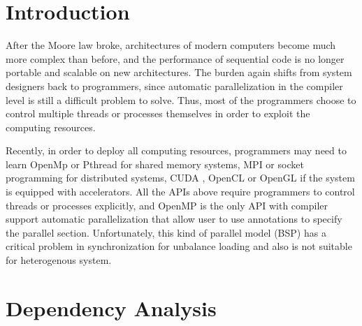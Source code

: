 \documentclass[preprint,11pt]{elsarticle}
\begin{document}
\linenumbers \linenumberdisplaymath

\section{Introduction}
  After the Moore law broke, architectures of modern computers become much more 
  complex than before, and the performance of sequential code is no longer portable and 
  scalable on new architectures. The burden again shifts from system designers back to 
  programmers, since automatic parallelization in the compiler level is still a difficult problem to 
  solve. Thus, most of the programmers choose to control multiple threads or processes 
  themselves in order to exploit the computing resources.  
  
  Recently, in order to deploy all computing resources, programmers may need to learn 
  OpenMp \cite{} or Pthread \cite{} for shared memory systems, MPI \cite{} or socket 
  programming for distributed systems, CUDA \cite{}, OpenCL \cite{} or OpenGL \cite{} if the 
  system is equipped with accelerators. 
  All the APIs above require programmers to control threads or processes explicitly, and
  OpenMP is the only API with compiler support automatic parallelization that allow user to 
  use annotations to specify the parallel section. Unfortunately, this kind of parallel model (BSP)
  has a critical problem in synchronization for unbalance loading and also is not suitable for
  heterogenous system.   
  
  
\section{Dependency Analysis}

\end{document}
